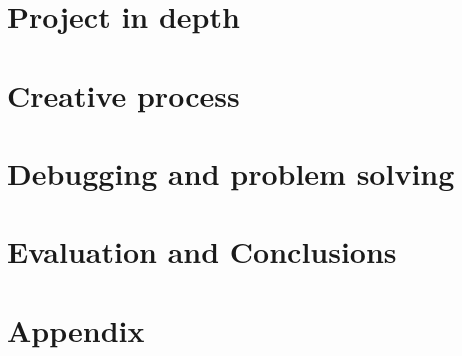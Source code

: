 \documentclass[12pt]{report}
\begin{document}
\chapter{Project in depth}
\label{sec:org1000348}
\chapter{Creative process}
\label{sec:org477d97b}
\chapter{Debugging and problem solving}
\label{sec:org0304358}
\chapter{Evaluation and Conclusions}
\label{sec:orga6920ef}
 


\chapter{Appendix}
\label{sec:org94bc895}
\end{document}
